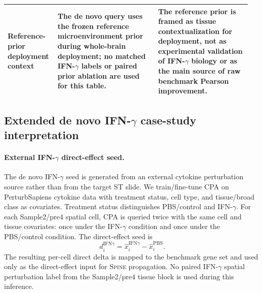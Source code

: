 \documentclass[sigconf,anonymous,review]{acmart}
\newcommand{\methodname}{\textsc{Spine}\xspace}
\begin{document}
\begin{table}[t]
\begin{tabular}{@{}p{0.18\linewidth}p{0.40\linewidth}p{0.37\linewidth}@{}}
Reference-prior deployment context &
The de novo query uses the frozen reference microenvironment prior during whole-brain deployment; no matched IFN-$\gamma$ labels or paired prior ablation are used for this table. &
The reference prior is framed as tissue contextualization for deployment, not as experimental validation of IFN-$\gamma$ biology or as the main source of raw benchmark Pearson improvement. \\
\bottomrule
\end{tabular}
\end{table}

\subsection{Extended de novo IFN-\texorpdfstring{$\gamma$}{gamma} case-study interpretation}
\label{app:ifng_extended_interpretation}

\paragraph{External IFN-\texorpdfstring{$\gamma$}{gamma} direct-effect seed.}
The de novo IFN-$\gamma$ seed is generated from an external cytokine perturbation source rather than from the target ST slide. We train/fine-tune CPA on PerturbSapiens cytokine data with treatment status, cell type, and tissue/broad class as covariates. Treatment status distinguishes PBS/control and IFN-$\gamma$. For each Sample2/pre4 spatial cell, CPA is queried twice with the same cell and tissue covariates: once under the IFN-$\gamma$ condition and once under the PBS/control condition. The direct-effect seed is
\[
d_i^{\mathrm{IFN}\gamma}
=
\widehat{x}_{i}^{\mathrm{IFN}\gamma}
-
\widehat{x}_{i}^{\mathrm{PBS}} .
\]
The resulting per-cell direct delta is mapped to the benchmark gene set and used only as the direct-effect input for \methodname{} propagation. No paired IFN-$\gamma$ spatial perturbation label from the Sample2/pre4 tissue block is used during this inference.
\end{document}
